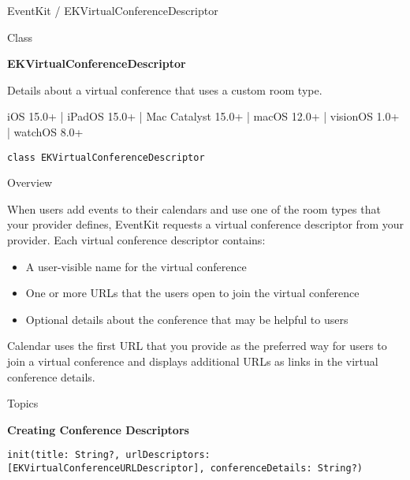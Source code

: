 \documentclass{article}
\title{}
\author{}
\date{}
\begin{document}
EventKit / EKVirtualConferenceDescriptor

Class

\textbf{EKVirtualConferenceDescriptor}

Details about a virtual conference that uses a custom room type.

iOS 15.0+ | iPadOS 15.0+ | Mac Catalyst 15.0+ | macOS 12.0+ | visionOS 1.0+ | watchOS 8.0+

\texttt{class EKVirtualConferenceDescriptor}

Overview

When users add events to their calendars and use one of the room types that your provider defines, EventKit requests a virtual conference descriptor from your provider. Each virtual conference descriptor contains:

\begin{itemize}
    \item A user-visible name for the virtual conference
    \item One or more URLs that the users open to join the virtual conference
    \item Optional details about the conference that may be helpful to users
\end{itemize}

Calendar uses the first URL that you provide as the preferred way for users to join a virtual conference and displays additional URLs as links in the virtual conference details.

\noindent{}

Topics

\textbf{Creating Conference Descriptors}

\texttt{init(title: String?, urlDescriptors: [EKVirtualConferenceURLDescriptor], conferenceDetails: String?)}
\end{document}
